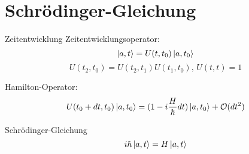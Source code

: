 \section{Schrödinger-Gleichung}

\begin{subbox}{Zeitentwicklung}
Zeitentwicklungsoperator:
\[ \ket{a, t} = U(t, t_0) \ket{a, t_0} \]
\[ U(t_2, t_0) = U(t_2, t_1) U(t_1, t_0), \, U(t,t) = 1 \]

Hamilton-Operator:
\[ U(t_0 + dt, t_0) \ket{a, t_0} = (1-i\frac{H}{\hbar} dt ) \ket{a, t_0} + \mathcal{O}(dt^2) \]
\end{subbox}

\begin{mainbox}{Schrödinger-Gleichung}
\[ i\hbar \ket{a,t} = H \ket{a,t}    \]
\end{mainbox}
